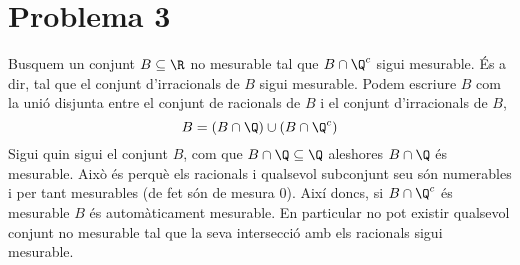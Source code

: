 \documentclass[12pt]{article}
\begin{document}



\section*{Problema 3}
Busquem un conjunt \( B \subseteq \R \) no mesurable tal que \( B \cap \Q^c \) sigui
mesurable. És a dir, tal que el conjunt d'irracionals de \( B \) sigui mesurable. Podem
escriure \( B \) com la unió disjunta entre el conjunt de racionals de \( B \) i el
conjunt d'irracionals de \( B \),
\begin{equation*}
	B = (B \cap \Q) \cup (B \cap \Q^c) 
\end{equation*}
Sigui quin sigui el conjunt \( B \), com que \( B \cap \Q \subseteq \Q \) aleshores \( B
\cap \Q \) és mesurable. Això és perquè els racionals i qualsevol subconjunt seu són
numerables i per tant mesurables (de fet són de mesura 0). Així doncs, si \( B \cap \Q^c
\) és mesurable \( B \) és automàticament mesurable. En particular no pot existir
qualsevol conjunt no mesurable tal que la seva intersecció amb els racionals sigui
mesurable.
\end{document}
